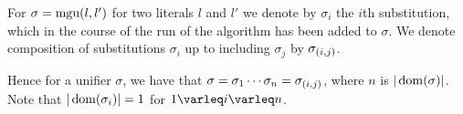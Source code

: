 	For $\sigma = \operatorname{mgu}(l, l')$ for two literals $l$ and $l'$ we denote by $\sigma_i$ the $i$th substitution, which in the course of the run of the algorithm has been added to $\sigma$. 
	We denote composition of substitutions $\sigma_i$ up to including $\sigma_j$ by $\sigma_{(i,j)}$. 

Hence for a unifier $\sigma$, we have that $ \sigma = \sigma_1\cdots\sigma_n = \sigma_{(i,j)}$, where $n$ is $|\operatorname{dom}(\sigma)|$.
Note that $|\operatorname{dom}(\sigma_i)| = 1$ for $1\varleq i \varleq n$.





